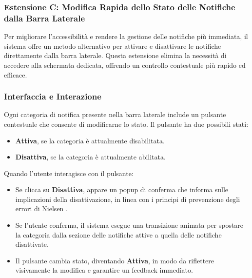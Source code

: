\clearpage
\newpage

\subsubsection{Estensione C: Modifica Rapida dello Stato delle Notifiche dalla Barra Laterale}

Per migliorare l’accessibilità e rendere la gestione delle notifiche più immediata, il sistema offre un metodo alternativo per attivare e disattivare le notifiche direttamente dalla barra laterale. Questa estensione elimina la necessità di accedere alla schermata dedicata, offrendo un controllo contestuale più rapido ed efficace.

\vspace{0.5cm}
\subsubsection{Interfaccia e Interazione}
Ogni categoria di notifica presente nella barra laterale include un pulsante contestuale che consente di modificarne lo stato. Il pulsante ha due possibili stati:

\begin{itemize}
    \item \textbf{Attiva}, se la categoria è attualmente disabilitata.
    \item \textbf{Disattiva}, se la categoria è attualmente abilitata.
\end{itemize}

Quando l’utente interagisce con il pulsante:
\begin{itemize}
    \item Se clicca su \textbf{Disattiva}, appare un popup di conferma che informa sulle implicazioni della disattivazione, in linea con i principi di prevenzione degli errori di Nielsen \cite{nielsen1995}.
    \item Se l’utente conferma, il sistema esegue una transizione animata per spostare la categoria dalla sezione delle notifiche attive a quella delle notifiche disattivate.
    \item Il pulsante cambia stato, diventando \textbf{Attiva}, in modo da riflettere visivamente la modifica e garantire un feedback immediato.
\end{itemize}


